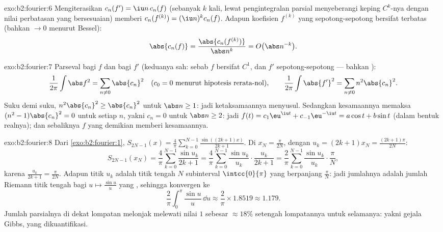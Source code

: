 \begin{solution}{exo:b2:fourier:6}
Mengiterasikan $c_n(f') = \iu n\,c_n(f)$ (sebanyak $k$ kali, lewat pengintegralan
parsial menyeberangi keping $C^{k}$-nya dengan nilai perbatasan yang bersesuaian) memberi
$c_n(f^{(k)}) = (\iu n)^k c_n(f)$. Adapun koefisien $f^{(k)}$ yang
 sepotong-sepotong bersifat terbatas (bahkan $\to 0$ menurut Bessel):
\[
\abs{c_n(f)} = \frac{\abs{c_n(f^{(k)})}}{\abs n^k}
= O\bigl(\abs n^{-k}\bigr) .
\]
\end{solution}

\begin{solution}{exo:b2:fourier:7}
Parseval bagi $f$ dan bagi $f'$ (keduanya sah: sebab $f$ bersifat $C^1$, dan $f'$
 sepotong-sepotong --- bahkan ):
\[
\frac{1}{2\pi}\int \abs f^2 = \sum_{n\neq0} \abs{c_n}^2
\quad (c_0 = 0 \text{ menurut hipotesis rerata-nol}),
\qquad
\frac{1}{2\pi}\int \abs{f'}^2 = \sum_{n\neq0} n^2\abs{c_n}^2 .
\]
Suku demi suku, $n^2\abs{c_n}^2 \geq \abs{c_n}^2$ untuk $\abs n \geq 1$:
jadi ketaksamaannya menyusul. Sedangkan kesamaannya memaksa $(n^2 - 1)\abs{c_n}^2 = 0$
untuk setiap $n$, yakni $c_n = 0$ untuk $\abs n \geq 2$: jadi $f(t) =
c_1\eu^{\iu t} + c_{-1}\eu^{-\iu t} = a\cos t + b\sin t$ (dalam bentuk
realnya); dan sebaliknya $f$ yang demikian memberi kesamaannya.
\end{solution}

\begin{solution}{exo:b2:fourier:8}
Dari \cref{exo:b2:fourier:1}, $S_{2N-1}(x) =
\frac4\pi\sum_{k=0}^{N-1}\frac{\sin((2k+1)x)}{2k+1}$. Di $x_N =
\frac{\pi}{2N}$, dengan $u_k = (2k+1)x_N = \frac{(2k+1)\pi}{2N}$:
\[
S_{2N-1}(x_N) = \frac{4}{\pi}\sum_{k=0}^{N-1}\frac{\sin u_k}{2k+1}
= \frac{4}{\pi}\sum_{k=0}^{N-1}\frac{\sin u_k}{u_k}\cdot
\frac{u_k}{2k+1}
= \frac{2}{\pi}\sum_{k=0}^{N-1}\frac{\sin u_k}{u_k}\cdot
\frac{\pi}{N},
\]
karena $\frac{u_k}{2k+1} = \frac{\pi}{2N}$. Adapun titik $u_k$ adalah
titik tengah $N$ subinterval $\intcc{0}{\pi}$ yang berpanjang
$\frac{\pi}{N}$: jadi jumlahnya adalah jumlah Riemann titik tengah bagi
$u \mapsto \frac{\sin u}{u}$ yang , sehingga konvergen ke
\[
\frac{2}{\pi}\int_0^\pi \frac{\sin u}{u}\,\dd u
\approx \frac{2}{\pi}\times 1.8519 \approx 1.179 .
\]
Jumlah parsialnya di dekat lompatan melonjak melewati nilai $1$ sebesar $\approx
18\%$ setengah lompatannya untuk selamanya: yakni gejala Gibbs, yang dikuantifikasi.
\end{solution}

